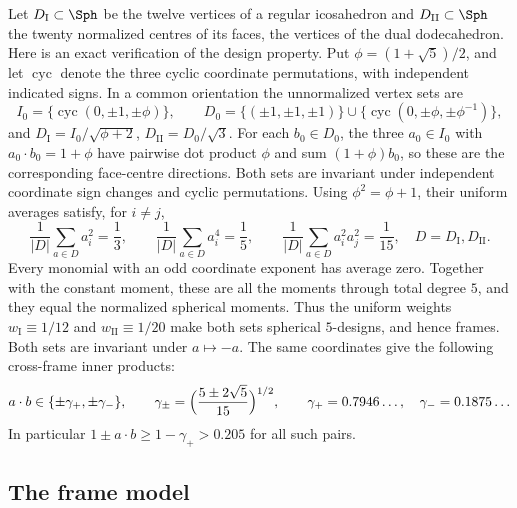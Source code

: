 Let $D_{\mathrm I} \subset \Sph$ be the twelve vertices of a regular icosahedron and $D_{\mathrm{II}} \subset \Sph$ the twenty normalized centres of its faces, the vertices of the dual dodecahedron. Here is an exact verification of the design property. Put $\phi=(1+\sqrt5)/2$, and let $\operatorname{cyc}$ denote the three cyclic coordinate permutations, with independent indicated signs. In a common orientation the unnormalized vertex sets are
\begin{equation*}
I_0=\{\operatorname{cyc}(0,\pm1,\pm\phi)\},\qquad
D_0=\{(\pm1,\pm1,\pm1)\}\cup
\{\operatorname{cyc}(0,\pm\phi,\pm\phi^{-1})\},
\end{equation*}
and $D_{\mathrm I}=I_0/\sqrt{\phi+2}$, $D_{\mathrm{II}}=D_0/\sqrt3$. For each $b_0\in D_0$, the three $a_0\in I_0$ with $a_0\cdot b_0=1+\phi$ have pairwise dot product $\phi$ and sum $(1+\phi)b_0$, so these are the corresponding face-centre directions. Both sets are invariant under independent coordinate sign changes and cyclic permutations. Using $\phi^2=\phi+1$, their uniform averages satisfy, for $i\ne j$,
\begin{equation*}
\frac1{|D|}\sum_{a\in D}a_i^2=\frac13,\qquad
\frac1{|D|}\sum_{a\in D}a_i^4=\frac15,\qquad
\frac1{|D|}\sum_{a\in D}a_i^2a_j^2=\frac1{15},
\quad D=D_{\mathrm I},D_{\mathrm{II}}.
\end{equation*}
Every monomial with an odd coordinate exponent has average zero. Together with the constant moment, these are all the moments through total degree $5$, and they equal the normalized spherical moments. Thus the uniform weights $w_{\mathrm I}\equiv1/12$ and $w_{\mathrm{II}}\equiv1/20$ make both sets spherical $5$-designs, and hence frames. Both sets are invariant under $a\mapsto-a$. The same coordinates give the following cross-frame inner products:
\begin{equation}\label{e:icodod}
a \cdot b \in \{ \pm \gamma_+, \pm \gamma_- \}, \qquad \gamma_\pm = \Bigl( \frac{5 \pm 2 \sqrt 5}{15} \Bigr)^{1/2}, \qquad \gamma_+ = 0.7946\ldots, \quad \gamma_- = 0.1875\ldots
\end{equation}
In particular $1 \pm a \cdot b \ge 1 - \gamma_+ > 0.205$ for all such pairs.

\subsection{The frame model}\label{s:framemodel}

